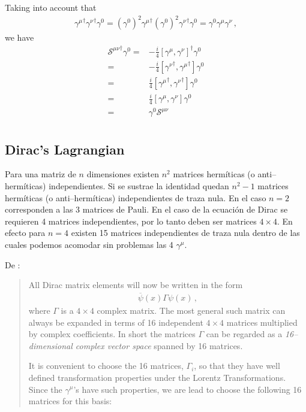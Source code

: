 Taking into account that
\begin{align}
  {\gamma^\mu}^\dagger{\gamma^\nu}^\dagger\gamma^0=\left(\gamma^0\right)^2{\gamma^\mu}^\dagger\left(\gamma^0\right)^2{\gamma^\nu}^\dagger\gamma^0=\gamma^0\gamma^\mu\gamma^\nu\,,
\end{align}
we have
\begin{align}
  {\mathcal{S}^{\mu\nu}}^\dagger \gamma^0=&-\frac{i}{4}\left[\gamma^\mu,\gamma^\nu\right]^\dagger\gamma^0\nonumber\\
=&-\frac{i}{4}\left[{\gamma^\nu}^\dagger,{\gamma^\mu}^\dagger\right]\gamma^0\nonumber\\
=&\frac{i}{4}\left[{\gamma^\mu}^\dagger,{\gamma^\nu}^\dagger\right]\gamma^0\nonumber\\
=&\frac{i}{4}\left[{\gamma^\mu},{\gamma^\nu}\right]\gamma^0\nonumber\\
=&\gamma^0\mathcal{S}^{\mu\nu}\nonumber\\
\end{align}


\subsection{Dirac's Lagrangian}
\label{sec:diracs-lagrangian}

Para una matriz de $n$ dimensiones existen $n^2$ matrices hermíticas (o anti--hermíticas) independientes. Si se sustrae la identidad quedan $n^2-1$ matrices hermíticas (o anti--hermíticas) independientes de traza nula. En el caso $n=2$ corresponden a las 3 matrices de Pauli. En el caso de la ecuación de Dirac se requieren 4 matrices independientes, por lo tanto deben ser matrices $4\times 4$. En efecto para $n=4$ existen 15 matrices independientes de traza nula dentro de las cuales podemos acomodar sin problemas las 4 $\gamma^\mu$. 

De \cite{Gross:1993}:
\begin{quote}
  All Dirac matrix elements will now be written in the form
  \begin{align}
    \overline{\psi}(x)\Gamma\psi(x)\,,
  \end{align}
where $\Gamma$ is a $4\times 4$ complex matrix. The most general such matrix can always be expanded in terms of 16 independent $4\times 4$ matrices multiplied by complex coefficients. In short the matrices $\Gamma$ can be regarded as a \emph{16--dimensional complex vector space} spanned by 16 matrices.

It is convenient to choose the 16 matrices, $\Gamma_i$, so that they have well defined transformation properties under the Lorentz Transformations. Since the $\gamma^\mu$'s have such properties, we are lead to choose the following 16 matrices for this basis:
\end{quote}


